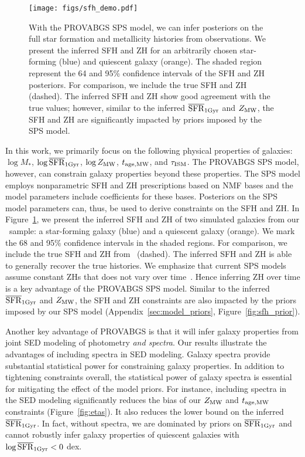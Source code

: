\begin{figure}
\begin{center}
\texttt{[image: figs/sfh\_demo.pdf]}
    \caption{
        With the {\sc PROVABGS} SPS model, we can infer posteriors on the full
        star formation and metallicity histories from observations. 
        We present the inferred SFH and ZH for an arbitrarily chosen
        star-forming (blue) and quiescent galaxy (orange).
        The shaded region represent the 64 and 95\% confidence intervals of the
        SFH and ZH posteriors. 
        For comparison, we include the true SFH and ZH (dashed). 
        The inferred SFH and ZH show good agreement with the true values;
        however, similar to the inferred $\overline{\rm SFR}_{\rm 1Gyr}$ and $Z_{\rm MW}$, the SFH and ZH
        are significantly impacted by priors imposed by the SPS model. 
    } \label{fig:sfh_demo}
\end{center}
\end{figure}
In this work, we primarily focus on the following physical properties of
galaxies: $\log M_*$, $\log\overline{\rm SFR}_{\rm 1Gyr}$, $\log Z_{\rm MW}$, $t_{\rm age, MW}$, and $\tau_{\rm ISM}$. 
The {\sc PROVABGS} SPS model, however, can constrain galaxy properties beyond
these properties. 
The SPS model employs nonparametric SFH and ZH prescriptions based on NMF bases
and the model parameters include coefficients for these bases. 
Posteriors on the SPS model parameters can, thus, be used to derive constraints
on the SFH and ZH. 
In Figure~\ref{fig:sfh_demo}, we present the inferred SFH and ZH of two
simulated galaxies from our \lgal~sample: a star-forming galaxy (blue) and a
quiescent galaxy (orange). 
We mark the 68 and 95\% confidence intervals in the shaded regions. 
For comparison, we include the true SFH and ZH from \lgal~(dashed).  
The inferred SFH and ZH is able to generally recover the true histories. 
We emphasize that current SPS models assume constant ZHs that does not vary
over time~\citep{carnall2017, leja2019}. 
Hence inferring ZH over time is a key advantage of the {\sc PROVABGS} SPS
model. 
Similar to the inferred $\overline{\rm SFR}_{\rm 1Gyr}$ and $Z_{\rm MW}$, the SFH and ZH constraints are
also impacted by the priors imposed by our SPS model
(Appendix~\ref{sec:model_priors}, Figure~\ref{fig:sfh_prior}).

Another key advantage of {\sc PROVABGS} is that it will infer galaxy
properties from joint SED modeling of photometry \emph{and spectra}. 
Our results illustrate the advantages of including spectra in SED modeling. 
Galaxy spectra provide substantial statistical power for constraining 
galaxy properties. 
In addition to tightening constraints overall, the statistical power of
galaxy spectra is essential for mitigating the effect of the model priors. 
For instance, including spectra in the SED modeling significantly reduces the
bias of our $Z_{\rm MW}$ and $t_{\rm age, MW}$ constraints (Figure~\ref{fig:etas}). 
It also reduces the lower bound on the inferred $\overline{\rm SFR}_{\rm 1Gyr}$. 
In fact, without spectra, we are dominated by priors on $\overline{\rm SFR}_{\rm 1Gyr}$ and cannot
robustly infer galaxy properties of quiescent galaxies with $\log\overline{\rm SFR}_{\rm 1Gyr} < 0$
dex.

